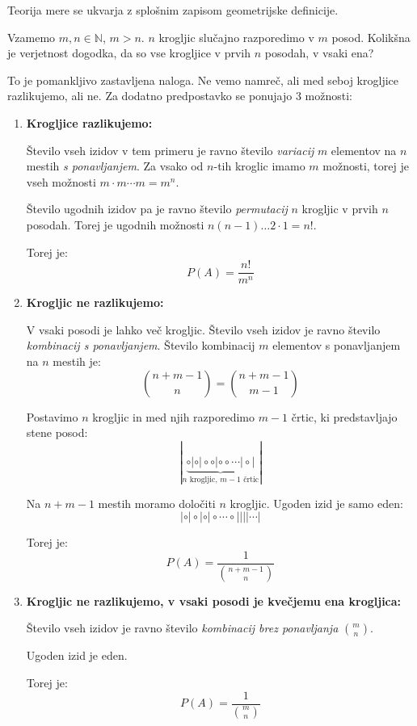 \documentclass[12pt]{book}
\def\n{\noindent}
\theoremstyle{definition}
\theoremstyle{plain}
\theoremstyle{plain}
\theoremstyle{plain}
\theoremstyle{remark}
\begin{document}
\n Teorija mere se ukvarja z splošnim zapisom geometrijske definicije. 

\begin{zgled}
    Vzamemo $m, n \in \mathbb{N}$, $m>n$. $n$ krogljic slučajno razporedimo v $m$ posod. Kolikšna je verjetnost dogodka, da so vse krogljice v prvih $n$ posodah, v vsaki ena?

    To je pomankljivo zastavljena naloga. Ne vemo namreč, ali med seboj krogljice razlikujemo, ali ne. Za dodatno predpostavko se ponujajo 3 možnosti: 
    \begin{enumerate}
        \item \textbf{Krogljice razlikujemo:}
        
        Število vseh izidov v tem primeru je ravno število \emph{variacij} $m$ elementov na $n$ mestih \emph{s ponavljanjem}. Za vsako od $n$-tih kroglic imamo $m$ možnosti, torej je vseh možnosti $m \cdot m \cdots m=m^n$.
        
        Število ugodnih izidov pa je ravno število \emph{permutacij} $n$ krogljic v prvih $n$ posodah. Torej je ugodnih možnosti $n(n-1) \ldots 2 \cdot 1=n!$.
        
        Torej je:
        $$
        P(A)=\frac{n !}{m^n}
        $$

        \item \textbf{Krogljic ne razlikujemo:} 
        
        V vsaki posodi je lahko več krogljic. Število vseh izidov je ravno število \emph{kombinacij s ponavljanjem}. Število kombinacij $m$ elementov s ponavljanjem na $n$ mestih je: 
        $$
        \binom{n+m-1}{n} = \binom{n+m-1}{m-1}
        $$

        \newpage

        Postavimo $n$ krogljic in med njih razporedimo $m-1$ črtic, ki predstavljajo stene posod:
        $$
        |\underbrace{\circ|\circ|\circ\circ |\circ\circ  \cdots |\circ |}_{n \text{ krogljic, } m-1 \text{ črtic}}|
        $$

        Na $n+m-1$ mestih moramo določiti $n$ krogljic. Ugoden izid je samo eden: 
        $$
        |\circ|\circ|\circ|\circ \cdots \circ|||| \cdots |
        $$

        Torej je:
        $$
        P(A)=\frac{1}{\binom{n+m-1}{n}}
        $$

        \item \textbf{Krogljic ne razlikujemo, v vsaki posodi je kvečjemu ena krogljica:} 
        
        Število vseh izidov je ravno število \emph{kombinacij brez ponavljanja} $\binom{m}{n}$. 
        
        Ugoden izid je eden. 

        Torej je:
        $$
        P(A)=\frac{1}{\binom{m}{n}}
        $$
    \end{enumerate}
\end{zgled}
\end{document}
